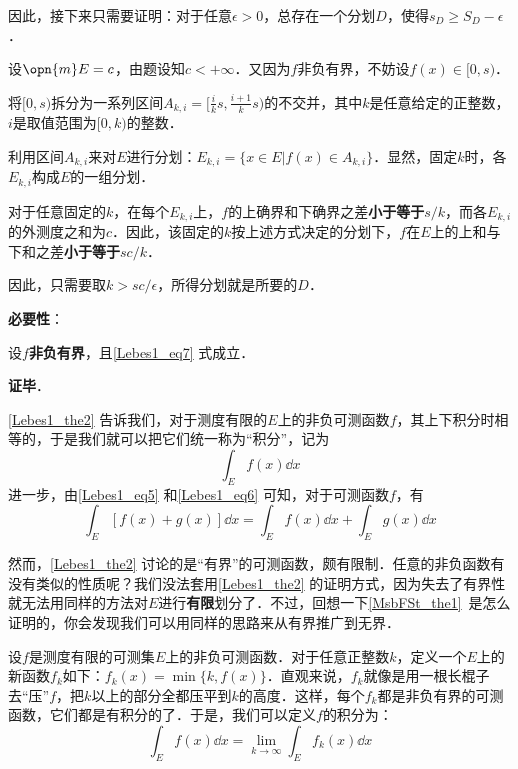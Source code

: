 因此，接下来只需要证明：对于任意$\epsilon>0$，总存在一个分划$D$，使得$s_D\geq S_D-\epsilon$．

设$\opn{m}E=c$，由题设知$c<+\infty$．又因为$f$非负有界，不妨设$f(x)\in [0, s)$．

将$[0, s)$拆分为一系列区间$A_{k, i}=[\frac{i}{k}s, \frac{i+1}{k}s)$的不交并，其中$k$是任意给定的正整数，$i$是取值范围为$[0, k)$的整数．

利用区间$A_{k, i}$来对$E$进行分划：$E_{k, i}=\{x\in E|f(x)\in A_{k, i}\}$．显然，固定$k$时，各$E_{k, i}$构成$E$的一组分划．

对于任意固定的$k$，在每个$E_{k, i}$上，$f$的上确界和下确界之差\textbf{小于等于}$s/k$，而各$E_{k, i}$的外测度之和为$c$．因此，该固定的$k$按上述方式决定的分划下，$f$在$E$上的上和与下和之差\textbf{小于等于}$sc/k$．

因此，只需要取$k>sc/\epsilon$，所得分划就是所要的$D$．

\textbf{必要性}：

设$f$\textbf{非负有界}，且\autoref{Lebes1_eq7} 式成立．




\textbf{证毕}．

\autoref{Lebes1_the2} 告诉我们，对于测度有限的$E$上的非负可测函数$f$，其上下积分时相等的，于是我们就可以把它们统一称为“积分”，记为
\begin{equation}
\int_E f(x) \dd x
\end{equation}
进一步，由\autoref{Lebes1_eq5} 和\autoref{Lebes1_eq6} 可知，对于可测函数$f$，有
\begin{equation}
\int_E [f(x)+g(x)] \dd x=\int_E f(x) \dd x+\int_E g(x) \dd x
\end{equation}

然而，\autoref{Lebes1_the2} 讨论的是“有界”的可测函数，颇有限制．任意的非负函数有没有类似的性质呢？我们没法套用\autoref{Lebes1_the2} 的证明方式，因为失去了有界性就无法用同样的方法对$E$进行\textbf{有限}划分了．不过，回想一下\autoref{MsbFSt_the1}~是怎么证明的，你会发现我们可以用同样的思路来从有界推广到无界．

设$f$是测度有限的可测集$E$上的非负可测函数．对于任意正整数$k$，定义一个$E$上的新函数$f_k$如下：$f_k(x)=\min \{k, f(x)\}$．直观来说，$f_k$就像是用一根长棍子去“压”$f$，把$k$以上的部分全都压平到$k$的高度．这样，每个$f_k$都是非负有界的可测函数，它们都是有积分的了．于是，我们可以定义$f$的积分为：
\begin{equation}
\int_E f(x) \dd x = \lim\limits_{k\to\infty} \int_E f_k(x) \dd x
\end{equation}

